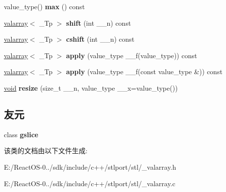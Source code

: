 \begin{DoxyCompactItemize}
value\+\_\+type() {\bfseries max} () const
\item 
\mbox{\label{classvalarray_acd7fe28c08d8bd7b1a9dc3506353f23e}} 
\hyperlink{classvalarray}{valarray}$<$ \+\_\+\+Tp $>$ {\bfseries shift} (int \+\_\+\+\_\+n) const
\item 
\mbox{\label{classvalarray_ab4b238e1925d9555241628ebd08617e3}} 
\hyperlink{classvalarray}{valarray}$<$ \+\_\+\+Tp $>$ {\bfseries cshift} (int \+\_\+\+\_\+n) const
\item 
\mbox{\label{classvalarray_a56f4c30f5a5c8625d4921eaf8b44697a}} 
\hyperlink{classvalarray}{valarray}$<$ \+\_\+\+Tp $>$ {\bfseries apply} (value\+\_\+type \+\_\+\+\_\+f(value\+\_\+type)) const
\item 
\mbox{\label{classvalarray_a35c038e561f07c7f0454824bd859b6a6}} 
\hyperlink{classvalarray}{valarray}$<$ \+\_\+\+Tp $>$ {\bfseries apply} (value\+\_\+type \+\_\+\+\_\+f(const value\+\_\+type \&)) const
\item 
\mbox{\label{classvalarray_ace22d22879ab2b77abe38cb25440f6ef}} 
\hyperlink{interfacevoid}{void} {\bfseries resize} (size\+\_\+t \+\_\+\+\_\+n, value\+\_\+type \+\_\+\+\_\+x=value\+\_\+type())
\end{DoxyCompactItemize}
\subsection*{友元}
\begin{DoxyCompactItemize}
\item 
\mbox{\label{classvalarray_a6d40ddc6fcd70fd39c41fb51c14cd9e7}} 
class {\bfseries gslice}
\end{DoxyCompactItemize}


该类的文档由以下文件生成\+:\begin{DoxyCompactItemize}
\item 
E\+:/\+React\+O\+S-\/0../sdk/include/c++/stlport/stl/\+\_\+valarray.\+h\item 
E\+:/\+React\+O\+S-\/0../sdk/include/c++/stlport/stl/\+\_\+valarray.\+c\end{DoxyCompactItemize}
